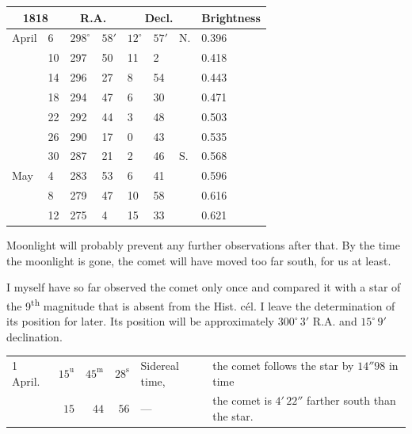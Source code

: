 \begin{center}\fontsize{10}{12}\selectfont\setlength{\tabcolsep}{3pt}
\begin{tabular}{ll|ll|lll|l}
\multicolumn{2}{c|}{1818} & \multicolumn{2}{c|}{R.A.} & \multicolumn{3}{c|}{Decl.} & Brightness \\
\hline
April & 6  & $298^\circ$ & $58'$ & $12^\circ$ & $57'$ & N. & 0.396 \\
      & 10 & 297 & 50 & 11 & 2  &    & 0.418 \\
      & 14 & 296 & 27 & 8  & 54 &    & 0.443 \\
      & 18 & 294 & 47 & 6  & 30 &    & 0.471 \\
      & 22 & 292 & 44 & 3  & 48 &    & 0.503 \\
      & 26 & 290 & 17 & 0  & 43 &    & 0.535 \\
      & 30 & 287 & 21 & 2  & 46 & S. & 0.568 \\
May   & 4  & 283 & 53 & 6  & 41 &    & 0.596 \\
      & 8  & 279 & 47 & 10 & 58 &    & 0.616 \\
      & 12 & 275 & 4  & 15 & 33 &    & 0.621 \\
\end{tabular}
\end{center}

\par\indent Moonlight will probably prevent any further observations after that. By the time the moonlight is gone, the comet will have moved too far south, for us at least.

\par\indent I myself have so far observed the comet only once and compared it with a star of the 9\textsuperscript{th} magnitude that is absent from the Hist. cél. I leave the determination of its position for later. Its position will be approximately $300^\circ\,3'$ R.A. and $15^\circ\,9'$ declination.

\begin{center}\fontsize{9}{11}\selectfont\setlength{\tabcolsep}{3pt}\begin{tabular}{lrrrll}
1 April. & $15^{\mathrm u}$ & $45^{\mathrm m}$ & $28^{\mathrm s}$ & Sidereal time, & \shortstack[l]{the comet follows the star by\\$14''98$ in time}\\
& $15$ & $44$ & $56$ & — & \shortstack[l]{the comet is $4'\,22''$\\farther south than the star.}\\
\end{tabular}\end{center}

